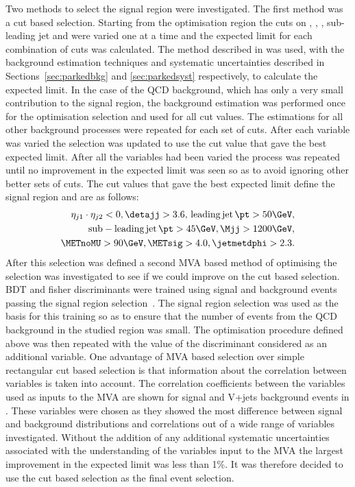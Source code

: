 Two methods to select the signal region were investigated. The first method was a cut based selection. Starting from the optimisation region the cuts on \METsig, \jetmetdphi, \detajj, sub-leading jet \pt and \Mjj were varied one at a time and the expected limit for each combination of cuts was calculated. The method described in  was used, with the background estimation techniques and systematic uncertainties described in Sections~\ref{sec:parkedbkg} and \ref{sec:parkedsyst} respectively, to calculate the expected limit. In the case of the \ac{QCD} background, which has only a very small contribution to the signal region, the background estimation was performed once for the optimisation selection and used for all cut values. The estimations for all other background processes were repeated for each set of cuts. After each variable was varied the selection was updated to use the cut value that gave the best expected limit. After all the variables had been varied the process was repeated until no improvement in the expected limit was seen so as to avoid ignoring other better sets of cuts. The cut values that gave the best expected limit define the signal region and are as follows:
\begin{equation}
  \label{eq:parkedsigsel}
  \begin{split}
    \eta_{j1}\cdot\eta_{j2}<0,\detajj>3.6,\,\mathrm{leading\,jet\,\pt}>50 \GeV,\\
    \mathrm{sub-leading\,jet\,\pt}>45 \GeV, \Mjj>1200 \GeV,\\
    \METnoMU>90 \GeV, \METsig>4.0,\jetmetdphi>2.3.
  \end{split}
\end{equation}
After this selection was defined a second \ac{MVA} based method of optimising the selection was investigated to see if we could improve on the cut based selection. \ac{BDT} and fisher discriminants were trained using signal and background events passing the signal region selection~\cite{TMVA}. The signal region selection was used as the basis for this training so as to ensure that the number of events from the \ac{QCD} background in the studied region was small. The optimisation procedure defined above was then repeated with the value of the discriminant considered as an additional variable. One advantage of \ac{MVA} based selection over simple rectangular cut based selection is that information about the correlation between variables is taken into account. The correlation coefficients between the variables used as inputs to the \ac{MVA} are shown for signal and V+jets background events in . These variables were chosen as they showed the most difference between signal and background distributions and correlations out of a wide range of variables investigated. Without the addition of any additional systematic uncertainties associated with the understanding of the variables input to the \ac{MVA} the largest improvement in the expected limit was less than 1\%. It was therefore decided to use the cut based selection as the final event selection.
